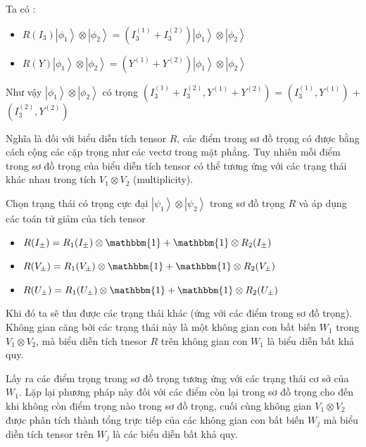 \documentclass{report}
\begin{document}
Ta có :

	\begin{itemize}
		\item \( R(I_{3}) \left| \phi_{1} \right\rangle \otimes \left| \phi_{2} \right\rangle = \left( I_{3}^{(1)} + I_{3}^{(2)} \right) \left| \phi_{1} \right\rangle \otimes \left| \phi_{2} \right\rangle \)
		\item \( R(Y) \left| \phi_{1} \right\rangle \otimes \left| \phi_{2} \right\rangle = \left( Y^{(1)} + Y^{(2)} \right) \left| \phi_{1} \right\rangle \otimes \left| \phi_{2} \right\rangle \)
	\end{itemize}
	
Như vậy \( \left| \phi_{1} \right\rangle \otimes \left| \phi_{2} \right\rangle \) có trọng \( \left( I_{3}^{(1)} + I_{3}^{(2)}, Y^{(1)} + Y^{(2)} \right) \) =  \( \left( I_{3}^{(1)}, Y^{(1)} \right) \) + \( \left( I_{3}^{(2)}, Y^{(2)} \right) \)

Nghĩa là đối với biểu diễn tích tensor \( R \), các điểm trong sơ đồ trọng có được bằng cách cộng các cặp trọng như các vectơ trong mặt phẳng. Tuy nhiên mỗi điểm trong sơ đồ trọng của biểu diễn tích tensor có thể tương ứng với các trạng thái khác nhau trong tích \( V_{1} \otimes V_{2} \) (multiplicity).

Chọn trạng thái có trọng cực đại \( \left| \psi_{1} \right\rangle \otimes \left| \psi_{2} \right\rangle \) trong sơ đồ trọng \( R \) và áp dụng các toán tử giảm của tích tensor

	\begin{itemize}
		\item \( R(I_{\pm}) = R_{1}(I_{\pm}) \otimes \mathbbm{1} + \mathbbm{1} \otimes R_{2}(I_{\pm}) \)
		\item \( R(V_{\pm}) = R_{1}(V_{\pm}) \otimes \mathbbm{1} + \mathbbm{1} \otimes R_{2}(V_{\pm}) \)
		\item \( R(U_{\pm}) = R_{1}(U_{\pm}) \otimes \mathbbm{1} + \mathbbm{1} \otimes R_{2}(U_{\pm}) \)
	\end{itemize}

Khi đó ta sẽ thu được các trạng thái khác (ứng với các điểm trong sơ đồ trọng). Không gian căng bởi các trạng thái này là một không gian con bất biến \( W_{1} \) trong \( V_{1} \otimes V_{2} \), mà biểu diễn tích tnesor \( R \) trên không gian con \( W_{1} \) là biểu diễn bất khả quy.

Lấy ra các điểm trọng trong sơ đồ trọng tương ứng với các trạng thái cơ sở của \( W_{1} \). Lặp lại phương pháp này đối với các điểm còn lại trong sơ đồ trọng cho đến khi không còn điểm trọng nào trong sơ đồ trọng, cuối cùng không gian \( V_{1} \otimes V_{2} \) được phân tích thành tổng trực tiếp của các không gian con bất biến \( W_{j} \) mà biểu diễn tích tensor trên \( W_{j} \) là các biểu diễn bất khả quy.
\end{document}
